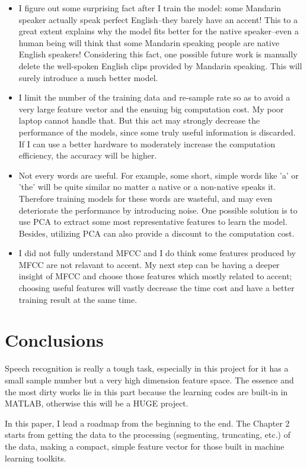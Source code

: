 \documentclass{sig-alternate}
\begin{document}
\begin{itemize}
    \item I figure out some surprising fact after I train the model: some Mandarin speaker actually speak perfect English--they barely have an accent! This to a great extent explains why the model fits better for the native speaker--even a human being will think that some Mandarin speaking people are native English speakers! Considering this fact, one possible future work is manually delete the well-spoken English clips provided by Mandarin speaking. This will surely introduce a much better model.
	\item I limit the number of the training data and re-sample rate so as to avoid a very large feature vector and the ensuing big computation cost. My poor laptop cannot handle that. But this act may strongly decrease the performance of the models, since some truly useful information is discarded. If I can use a better hardware to moderately increase the computation efficiency, the accuracy will be higher.
    \item Not every words are useful. For example, some short, simple words like 'a' or 'the' will be quite similar no matter a native or a non-native speaks it. Therefore training models for these words are wasteful, and may even deteriorate the performance by introducing noise. One possible solution is to use PCA to extract some most representative features to learn the model. Besides, utilizing PCA can also provide a discount to the computation cost.
    \item I did not fully understand MFCC and I do think some features produced by MFCC are not relavant to accent. My next step can be having a deeper insight of MFCC and choose those features which mostly related to accent; choosing useful features will vastly decrease the time cost and have a better training result at the same time.

\end{itemize}

\section{Conclusions}
Speech recognition is really a tough task, especially in this project for it has a small sample number but a very high dimension feature space. The essence and the most dirty works lie in this part because the learning codes are built-in in MATLAB, otherwise this will be a HUGE project.

In this paper, I lead a roadmap from the beginning to the end. The Chapter 2 starts from getting the data to the processing (segmenting, truncating, etc.) of the data, making a compact, simple feature vector for those built in machine learning toolkits.
\end{document}
